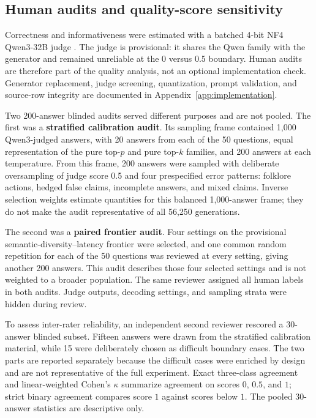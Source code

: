 \documentclass[11pt]{article}
\begin{document}
\subsection{Human audits and quality-score sensitivity}

Correctness and informativeness were estimated with a batched 4-bit NF4
Qwen3-32B judge \cite{qwen3report,dettmers2023qlora}. The judge is provisional:
it shares the Qwen family with the generator and remained unreliable at the
0 versus 0.5 boundary. Human audits are therefore part of the quality analysis,
not an optional implementation check. Generator replacement, judge screening,
quantization, prompt validation, and source-row integrity are documented in
Appendix~\ref{app:implementation}.

Two 200-answer blinded audits served different purposes and are not pooled. The first was
a \textbf{stratified calibration audit}. Its sampling frame contained 1,000
Qwen3-judged answers, with 20 answers from each of the 50 questions, equal
representation of the pure top-$p$ and pure top-$k$ families, and 200 answers
at each temperature. From this frame, 200 answers were sampled with deliberate
oversampling of judge score 0.5 and four prespecified error patterns: folklore
actions, hedged false claims, incomplete answers, and mixed claims. Inverse
selection weights estimate quantities for this balanced 1,000-answer frame;
they do not make the audit representative of all 56,250 generations.

The second was a \textbf{paired frontier audit}. Four settings on the
provisional semantic-diversity--latency frontier were selected, and one common
random repetition for each of the 50 questions was reviewed at every setting,
giving another 200 answers. This audit describes those four selected settings
and is not weighted to a broader population. The same reviewer assigned all
human labels in both audits. Judge outputs, decoding settings, and sampling
strata were hidden during review.

To assess inter-rater reliability, an independent second reviewer rescored a
30-answer blinded subset. Fifteen answers were drawn from the stratified
calibration material, while 15 were deliberately chosen as difficult boundary
cases. The two parts are reported separately because the difficult cases were
enriched by design and are not representative of the full experiment. Exact
three-class agreement and linear-weighted Cohen's $\kappa$ summarize agreement
on scores $0$, $0.5$, and $1$; strict binary agreement compares score $1$
against scores below $1$. The pooled 30-answer statistics are descriptive only.
\end{document}
